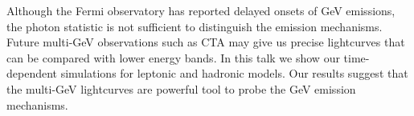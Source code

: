 


\bigskip



\bigskip

\noindent Although the Fermi observatory has reported delayed onsets of GeV emissions, the photon statistic is not sufficient to distinguish the emission mechanisms. Future multi-GeV observations such as CTA may give us precise lightcurves that can be compared with lower energy bands. In this talk we show our time-dependent simulations for leptonic and hadronic models. Our results suggest that the multi-GeV lightcurves are powerful tool to probe the GeV emission mechanisms.
